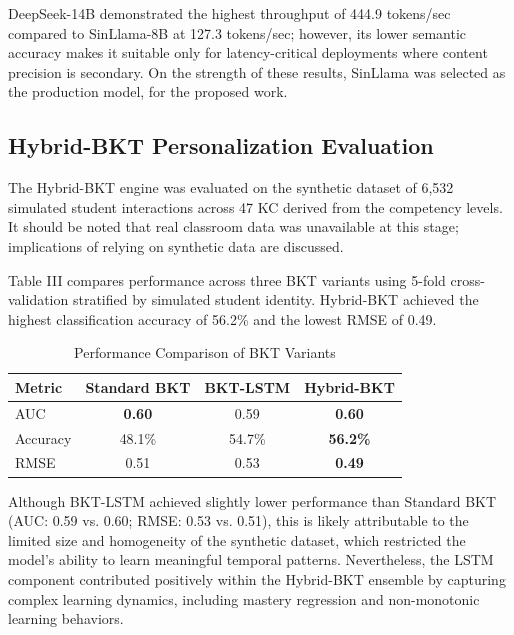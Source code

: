 \documentclass[conference]{IEEEtran}
\begin{document}
\vspace{-1.0em}

DeepSeek-14B demonstrated the highest throughput of 444.9 tokens/sec compared to SinLlama-8B at 127.3 tokens/sec; however, its lower semantic accuracy makes it suitable only for latency-critical deployments where content precision is secondary. On the strength of these results, SinLlama was selected as the production model, for the proposed work.

\subsection{Hybrid-BKT Personalization Evaluation}
The Hybrid-BKT engine was evaluated on the synthetic dataset of 6,532 simulated student interactions across 47 KC derived from the competency levels. It should be noted that real classroom data was unavailable at this stage; implications of relying on synthetic data are discussed.

Table III compares performance across three BKT variants using 5-fold cross-validation stratified by simulated student identity. Hybrid-BKT achieved the highest classification accuracy of 56.2\% and the lowest RMSE of 0.49.

\begin{table}[htbp]
\caption{Performance Comparison of BKT Variants}
\label{tab3}
\vspace{-1.5em}
\begin{center}
\begin{tabular}{lccc}
\toprule
\textbf{Metric} & \textbf{Standard BKT} & \textbf{BKT-LSTM} & \textbf{Hybrid-BKT} \\
\midrule
AUC & \textbf{0.60} & 0.59 & \textbf{0.60} \\
Accuracy & 48.1\% & 54.7\% & \textbf{56.2\%} \\
RMSE & 0.51 & 0.53 & \textbf{0.49} \\
\bottomrule
\end{tabular}
\end{center}
\vspace{-1.0em}
\end{table}
Although BKT-LSTM achieved slightly lower performance than Standard BKT (AUC: 0.59 vs. 0.60; RMSE: 0.53 vs. 0.51), this is likely attributable to the limited size and homogeneity of the synthetic dataset, which restricted the model's ability to learn meaningful temporal patterns. Nevertheless, the LSTM component contributed positively within the Hybrid-BKT ensemble by capturing complex learning dynamics, including mastery regression and non-monotonic learning behaviors.
\end{document}
